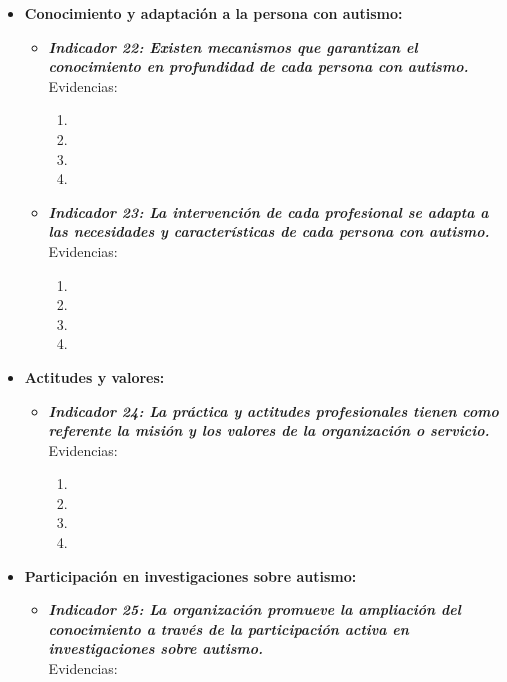 \begin{itemize}
\begin{itemize}
\begin{itemize}
			
		\end{itemize}
		\item \textbf{Conocimiento y adaptación a la persona con autismo: }
		\begin{itemize}
			\item \textbf{\textit{Indicador 22: Existen mecanismos que garantizan el conocimiento en profundidad de cada persona con autismo.}}\\Evidencias:
			
			\begin{enumerate}
				\item 
				\item 
				\item 
				\item 
			\end{enumerate}
			\item \textbf{\textit{Indicador 23: La intervención de cada profesional se adapta a las necesidades y características de cada persona con autismo.}}\\Evidencias:
			
			\begin{enumerate}
				\item 
				\item 
				\item 
				\item 
			\end{enumerate}
			
		\end{itemize}
		\item \textbf{Actitudes y valores:}
		\begin{itemize}
			\item \textbf{\textit{Indicador 24: La práctica y actitudes profesionales tienen como referente la misión y los valores de la organización o servicio.}}\\Evidencias:
			
			\begin{enumerate}
				\item 
				\item 
				\item 
				\item 
			\end{enumerate}
		\end{itemize}
		\item \textbf{Participación en investigaciones sobre autismo:}
		\begin{itemize}
			\item \textbf{\textit{Indicador 25: La organización promueve la ampliación del conocimiento a través de la participación activa en investigaciones sobre autismo.}}\\Evidencias:
			

\end{itemize}
\end{itemize}
\end{itemize}
